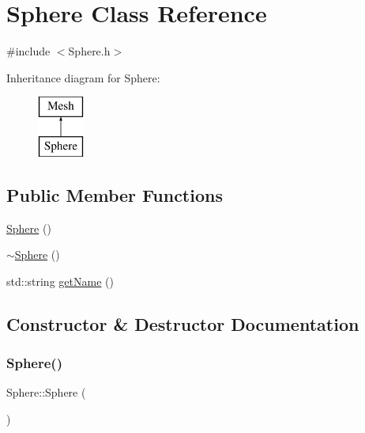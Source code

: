 \hypertarget{class_sphere}{}\section{Sphere Class Reference}
\label{class_sphere}


{\ttfamily \#include $<$Sphere.\+h$>$}

Inheritance diagram for Sphere\+:\begin{figure}[H]
\begin{center}
\leavevmode
\includegraphics[height=2.000000cm]{class_sphere}
\end{center}
\end{figure}
\subsection*{Public Member Functions}
\begin{DoxyCompactItemize}
\item 
\mbox{\hyperlink{class_sphere_a890a63ff583cb88e7ec4e840b4ef5eb9}{Sphere}} ()
\item 
\mbox{\hyperlink{class_sphere_a569c071e50a3e11f678630ee1a17737e}{$\sim$\+Sphere}} ()
\item 
std\+::string \mbox{\hyperlink{class_sphere_a173e667086ecd8b9d972e1d6f9885d9d}{get\+Name}} ()
\end{DoxyCompactItemize}


\subsection{Constructor \& Destructor Documentation}
\mbox{\label{class_sphere_a890a63ff583cb88e7ec4e840b4ef5eb9}} 
\subsubsection{\texorpdfstring{Sphere()}{Sphere()}}
{\footnotesize\ttfamily Sphere\+::\+Sphere (\begin{DoxyParamCaption}{ }\end{DoxyParamCaption})}

\mbox{\label{class_sphere_a569c071e50a3e11f678630ee1a17737e}} 
